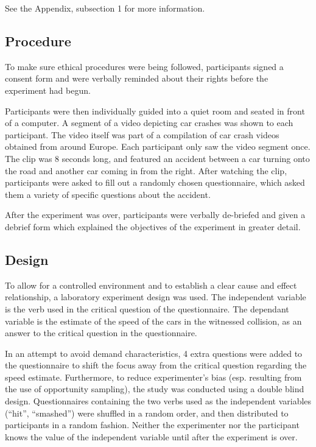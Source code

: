 \documentclass[a4paper,twocolumn]{report}
\begin{document}
See the Appendix, subsection 1 for more information.

\subsection{Procedure}

To make sure ethical procedures were being followed, participants signed a
consent form and were verbally reminded about their rights before the
experiment had begun.

Participants were then individually guided into a quiet room and seated in
front of a computer. A segment of a video depicting car crashes was shown
to each participant. The video itself was part of a compilation of car
crash videos obtained from around Europe. Each participant only saw the
video segment once. The clip was 8 seconds long, and featured an accident
between a car turning onto the road and another car coming in from the right.
After watching the clip, participants were asked to fill out a randomly
chosen questionnaire, which asked them a variety of specific questions about
the accident.

After the experiment was over, participants were verbally de-briefed and
given a debrief form which explained the objectives of the experiment in
greater detail.

\subsection{Design}

To allow for a controlled environment and to establish a clear cause and
effect relationship, a laboratory experiment design was used. The
independent variable is the verb used in the critical question of the
questionnaire. The dependant variable is the estimate of the speed of the
cars in the witnessed collision, as an answer to the critical question in
the questionnaire.

In an attempt to avoid demand characteristics, 4 extra questions were added
to the questionnaire to shift the focus away from the critical question
regarding the speed estimate. Furthermore, to reduce experimenter’s bias
(esp. resulting from the use of opportunity sampling), the study was
conducted using a double blind design. Questionnaires containing the two
verbs used as the independent variables (“hit”, “smashed”) were shuffled in
a random order, and then distributed to participants in a random fashion.
Neither the experimenter nor the participant knows the value of the
independent variable until after the experiment is over.
\end{document}
